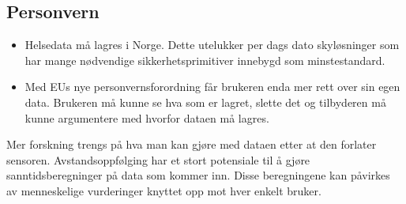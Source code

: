 \subsection{Personvern}

\begin{itemize}
  \item Helsedata må lagres i Norge. Dette utelukker per dags dato skyløsninger
  som har mange nødvendige sikkerhetsprimitiver innebygd som minstestandard.
  \item Med EUs nye personvernsforordning får brukeren enda mer rett over sin egen data.
  Brukeren må kunne se hva som er lagret, slette det og tilbyderen må kunne argumentere
  med hvorfor dataen må lagres.
\end{itemize}

Mer forskning trengs på hva man kan gjøre med dataen etter at den forlater sensoren.
Avstandsoppfølging har et stort potensiale til å gjøre sanntidsberegninger på data
som kommer inn. Disse beregningene kan påvirkes av menneskelige vurderinger knyttet
opp mot hver enkelt bruker.

